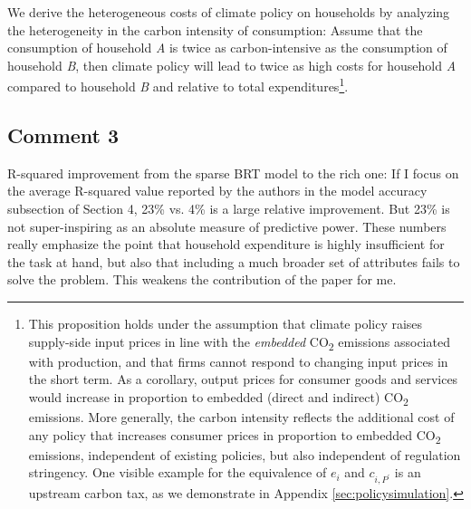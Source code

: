 \documentclass[11pt]{article}
\begin{document}
\begin{revisionbox}
    We derive the heterogeneous costs of climate policy on households by analyzing the heterogeneity in the carbon intensity of consumption: Assume that the consumption of household \textit{A} is twice as carbon-intensive as the consumption of household \textit{B}, then climate policy will lead to twice as high costs for household \textit{A} compared to household \textit{B} and relative to total expenditures\footnote{This proposition holds under the assumption that climate policy raises supply-side input prices in line with the \textit{embedded} CO\textsubscript{2} emissions associated with production, and that firms cannot respond to changing input prices in the short term. As a corollary, output prices for consumer goods and services would increase in proportion  to embedded (direct and indirect) CO\textsubscript{2} emissions. More generally, the carbon intensity reflects the additional cost of any policy that increases consumer prices in proportion to embedded CO\textsubscript{2} emissions, independent of existing policies, but also independent of regulation stringency. One visible example for the equivalence of $e_{i}$ and $c_{i,P^{\prime}}$ is an upstream carbon tax, as we demonstrate in Appendix \ref{sec:policysimulation}.}.
\end{revisionbox}


\subsection*{Comment 3}\label{comment_R1_3}

\begin{commentbox}
    R-squared improvement from the sparse BRT model to the rich one: If I focus on the average R-squared value reported by the authors in the model accuracy subsection of Section 4, 23\% vs. 4\% is a large relative improvement. But 23\% is not super-inspiring as an absolute measure of predictive power. These numbers really emphasize the point that household expenditure is highly insufficient for the task at hand, but also that including a much broader set of attributes fails to solve the problem. This weakens the contribution of the paper for me.
\end{commentbox}
\end{document}

